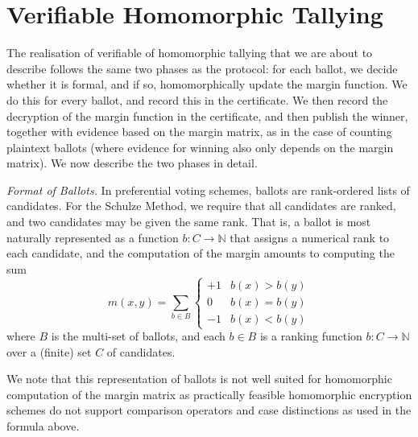 \documentclass{llncs}
\newcommand{\Nat}{\mathbb{N}}
\begin{document}
\section{Verifiable Homomorphic Tallying}
The realisation of verifiable of homomorphic tallying that we are about to
describe follows the same two phases as the protocol: for each
ballot, we decide whether it is formal, and if so, homomorphically
update the margin function. We do this for every ballot, and record
this in the certificate. We then record the decryption of the margin
function in the certificate, and then publish the winner, together
with evidence based on the margin matrix, as in the case of counting
plaintext ballots (where evidence for winning also only depends on
the margin matrix).  We now describe the two phases in detail.

\smallskip\noindent\emph{Format of Ballots.} In preferential voting
schemes, ballots are rank-ordered lists of candidates. For the
Schulze Method, we require that all candidates are ranked, and two
candidates may be given the same rank. That is, a ballot is most
naturally represented as a function $b: C \to \Nat$ that assigns a
numerical rank to each candidate, and the computation of the margin
amounts to computing the sum
\[ m(x, y) = \sum_{b \in B} \begin{cases} +1 & b(x) > b(y) \\ 0 &
b(x) = b(y) \\ -1 & b(x) < b(y) \end{cases} \]
where $B$ is the multi-set of ballots, and each $b \in B$ is a
ranking function $b: C \to \Nat$ over a (finite) set $C$ of
candidates. 

We note that this representation of ballots is not well suited for
homomorphic computation of the margin matrix as practically feasible
homomorphic encryption schemes do not support comparison operators
and case distinctions as used in the formula above. 
\end{document}
